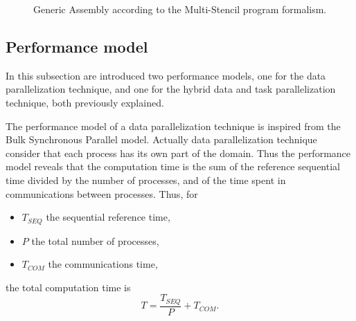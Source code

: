 \begin{figure}[t]
\begin{center}
\vspace*{.5em}
\caption{Generic Assembly according to the Multi-Stencil program formalism.}
\label{fig:specass}
\end{center}
\end{figure}

\subsection{Performance model}
\label{sect:perfs}

In this subsection are introduced two performance models, one for the data parallelization technique, and one for the hybrid data and task parallelization technique, both previously explained.

The performance model of a data parallelization technique is inspired from the Bulk Synchronous Parallel model. Actually data parallelization technique consider that each process has its own part of the domain. Thus the performance model reveals that the computation time is the sum of the reference sequential time divided by the number of processes, and of the time spent in communications between processes. Thus, for
\begin{itemize}
\item $T_{SEQ}$ the sequential reference time, 
\item $P$ the total number of processes, 
\item $T_{COM}$ the communications time, 
\end{itemize}
the total computation time is
\begin{equation}
T = \frac{T_{SEQ}}{P} + T_{COM}.
\end{equation}

